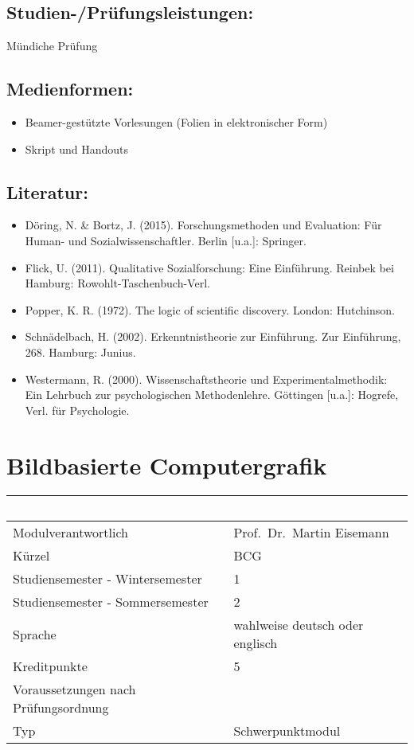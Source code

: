\section*{Studien-/Prüfungsleistungen:}\label{studien-pruxfcfungsleistungen-14}

Mündiche Prüfung

\section*{Medienformen:}\label{medienformen-14}

\begin{itemize}
\item
  Beamer-gestützte Vorlesungen (Folien in elektronischer Form)
\item
  Skript und Handouts
\end{itemize}

\section*{Literatur:}\label{literatur-11}

\begin{itemize}
\item
  Döring, N. \& Bortz, J. (2015). Forschungsmethoden und Evaluation: Für
  Human- und Sozialwissenschaftler. Berlin {[}u.a.{]}: Springer.
\item
  Flick, U. (2011). Qualitative Sozialforschung: Eine Einführung.
  Reinbek bei Hamburg: Rowohlt-Taschenbuch-Verl.
\item
  Popper, K. R. (1972). The logic of scientific discovery. London:
  Hutchinson.
\item
  Schnädelbach, H. (2002). Erkenntnistheorie zur Einführung. Zur
  Einführung, 268. Hamburg: Junius.
\item
  Westermann, R. (2000). Wissenschaftstheorie und Experimentalmethodik:
  Ein Lehrbuch zur psychologischen Methodenlehre. Göttingen {[}u.a.{]}:
  Hogrefe, Verl. für Psychologie.
\end{itemize}

\chapter{Bildbasierte Computergrafik}\label{bildbasierte-computergrafik}

\begin{longtable}[]{@{}ll@{}}
\toprule
~ & ~\tabularnewline
\midrule
\endhead
Modulverantwortlich & Prof.~Dr.~Martin Eisemann\tabularnewline
Kürzel & BCG\tabularnewline
Studiensemester - Wintersemester & 1\tabularnewline
Studiensemester - Sommersemester & 2\tabularnewline
Sprache & wahlweise deutsch oder englisch\tabularnewline
Kreditpunkte & 5\tabularnewline
Voraussetzungen nach Prüfungsordnung & ~\tabularnewline
Typ & Schwerpunktmodul\tabularnewline
\bottomrule
\end{longtable}

